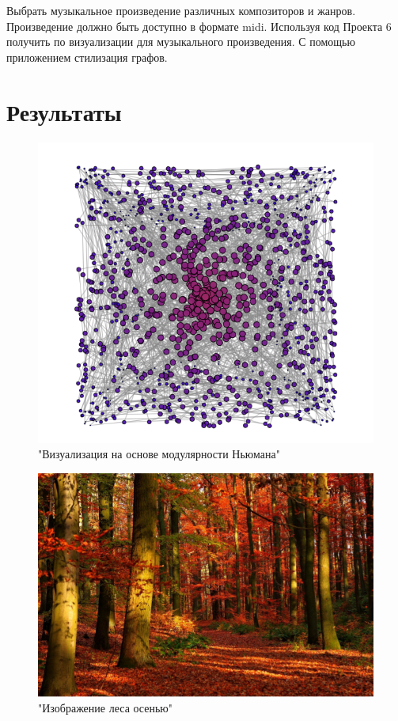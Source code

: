 Выбрать музыкальное произведение различных композиторов и жанров. Произведение должно быть доступно в формате midi. Используя код Проекта 6 получить по визуализации для музыкального произведения. С помощью приложением стилизация графов.

\section{Результаты}

\begin{figure}[h!]
	\centering
	\includegraphics[scale=1]{img/sem2.png} %
	\caption{"Визуализация на основе модулярности Ньюмана"}
	\label{img:sem2}
\end{figure}

\begin{figure}[h!]
	\centering
	\includegraphics[scale=0.3]{img/styled.jpg} %
	\caption{"Изображение леса осенью"}
	\label{img:styled}
\end{figure} 

